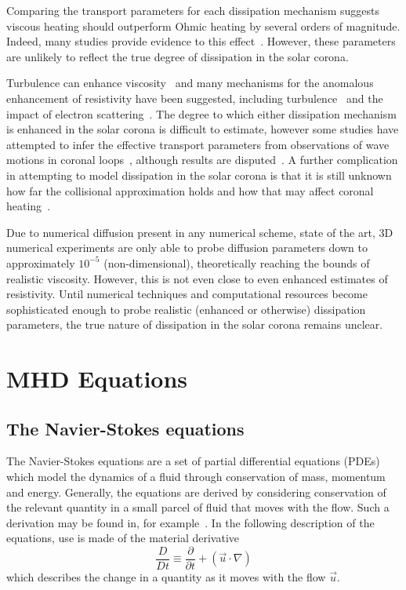 Comparing the transport parameters for each dissipation mechanism suggests viscous heating should outperform Ohmic heating by several orders of magnitude. Indeed, many studies provide evidence to this effect~\cite{browningMechanismsSolarCoronal1991,craigViscousDissipation3D2013,craigAnisotropicViscousDissipation2009a,armstrongViscoResistiveDissipation2013,hollwegViscosityChewGoldbergerLowEquations1986a}. However, these parameters are unlikely to reflect the true degree of dissipation in the solar corona. 

Turbulence can enhance viscosity~\cite{canutoTurbulentViscosity1988} and many mechanisms for the anomalous enhancement of resistivity have been suggested, including turbulence~\cite{cheHowAnomalousResistivity2017} and the impact of electron scattering~\cite{maEffectiveResistivityCollisionless2018}. The degree to which either dissipation mechanism is enhanced in the solar corona is difficult to estimate, however some studies have attempted to infer the effective transport parameters from observations of wave motions in coronal loops~\cite{nakariakovTRACEObservationDamped1999}, although results are disputed~\cite{klimchukCoronalSeismologyPropagation2004}. A further complication in attempting to model dissipation in the solar corona is that it is still unknown how far the collisional approximation holds and how that may affect coronal heating~\cite{klimchukSolvingCoronalHeating2006a}.

Due to numerical diffusion present in any numerical scheme, state of the art, 3D numerical experiments are only able to probe diffusion parameters down to approximately $10^{-5}$ (non-dimensional), theoretically reaching the bounds of realistic viscosity. However, this is not even close to even enhanced estimates of resistivity. Until numerical techniques and computational resources become sophisticated enough to probe realistic (enhanced or otherwise) dissipation parameters, the true nature of dissipation in the solar corona remains unclear.

\section{MHD Equations}

\subsection{The Navier-Stokes equations}

The Navier-Stokes equations are a set of partial differential equations (PDEs) which model the dynamics of a fluid through conservation of mass, momentum and energy. Generally, the equations are derived by considering conservation of the relevant quantity in a small parcel of fluid that moves with the flow. Such a derivation may be found in, for example~\cite{andersonComputationalFluidDynamics1995}. In the following description of the equations, use is made of the material derivative
\begin{equation}
  \label{eq:material_derivative}
  \frac{D}{Dt} \equiv \frac{\partial}{\partial t} + (\vec{u} \cdot \nabla)
\end{equation}
which describes the change in a quantity as it moves with the flow $\vec{u}$.


